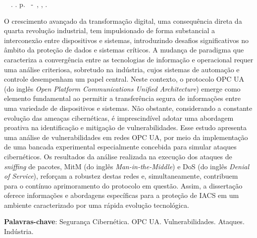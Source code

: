 \setlength{\absparsep}{18pt} %
\begin{resumo}
	\begin{flushleft} 
			\setlength{\absparsep}{0pt} %
			\SingleSpacing 
			\imprimirautorabr~~\textbf{\imprimirtituloresumo}.	\imprimirdata. \pageref{LastPage}p. 
			\imprimirtipotrabalho~-~\imprimirinstituicao, \imprimirlocal, \imprimirdata. 
 	\end{flushleft}
\OnehalfSpacing

O crescimento avançado da transformação digital, uma consequência direta da quarta revolução industrial, tem impulsionado de forma substancial a interconexão entre dispositivos e sistemas, introduzindo desafios significativos no âmbito da proteção de dados e sistemas críticos. A mudança de paradigma que caracteriza a convergência entre as tecnologias de informação e operacional requer uma análise criteriosa, sobretudo na indústria, cujos sistemas de automação e controle desempenham um papel central. Neste contexto, o protocolo OPC UA (do inglês \textit{Open Platform Communications Unified Architecture}) emerge como elemento fundamental ao permitir a transferência segura de informações entre uma variedade de dispositivos e sistemas. Não obstante, considerando a constante evolução das ameaças cibernéticas, é imprescindível adotar uma abordagem proativa na identificação e mitigação de vulnerabilidades. Esse estudo apresenta uma análise de vulnerabilidades em redes OPC UA, por meio da implementação de uma bancada experimental especialmente concebida para simular ataques cibernéticos. Os resultados da análise realizada na execução dos ataques de \textit{sniffing} de pacotes, MitM (do inglês \textit{Man-in-the-Middle}) e DoS (do inglês \textit{Denial of Service}), reforçam a robustez destas redes e, simultaneamente, contribuem para o contínuo aprimoramento do protocolo em questão. Assim, a dissertação oferece informações e abordagens específicas para a proteção de IACS em um ambiente caracterizado por uma rápida evolução tecnológica.
 
 \textbf{Palavras-chave}: Segurança Cibernética. OPC UA. Vulnerabilidades. Ataques. Indústria.
\end{resumo}